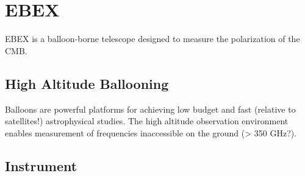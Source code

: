 \chapter{EBEX}
\label{ebex_chapter}

EBEX is a balloon-borne telescope designed to measure the polarization of the \ac{CMB}.

\section{High Altitude Ballooning}
\label{ballooning_section}

Balloons are powerful platforms for achieving low budget and fast (relative to satellites!) astrophysical studies. The high altitude observation environment enables measurement of frequencies inaccessible on the ground (> 350 GHz?). 



\section{Instrument}
\label{instrument_section}




